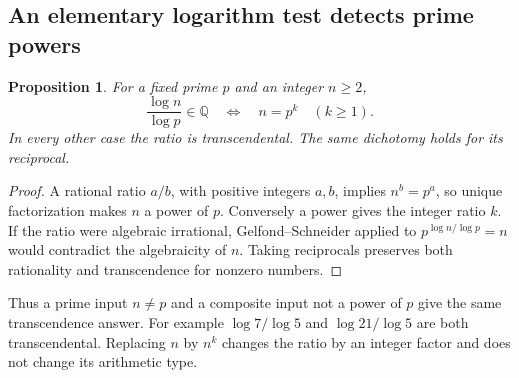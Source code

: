 \documentclass[11pt,a4paper]{article}
\newtheorem{proposition}[theorem]{Proposition}
\theoremstyle{definition}
\theoremstyle{remark}
\numberwithin{equation}{section}
\begin{document}
\subsection{An elementary logarithm test detects prime powers}
\begin{proposition}
For a fixed prime $p$ and an integer $n\ge2$,
\[
 \frac{\log n}{\log p}\in\mathbb Q
 \quad\Longleftrightarrow\quad n=p^k\quad(k\ge1).
\]
In every other case the ratio is transcendental. The same dichotomy holds
for its reciprocal.
\end{proposition}
\begin{proof}
A rational ratio $a/b$, with positive integers $a,b$, implies
$n^b=p^a$, so unique factorization makes $n$ a power of $p$.
Conversely a power gives the integer ratio $k$. If the ratio were
algebraic irrational, Gelfond--Schneider applied to $p^{\log n/\log p}=n$
would contradict the algebraicity of $n$. Taking reciprocals preserves
both rationality and transcendence for nonzero numbers.
\end{proof}
Thus a prime input $n\ne p$ and a composite input not a power of $p$
give the same transcendence answer. For example $\log7/\log5$ and
$\log21/\log5$ are both transcendental. Replacing $n$ by $n^k$ changes
the ratio by an integer factor and does not change its arithmetic type.
\end{document}
